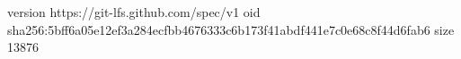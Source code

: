 version https://git-lfs.github.com/spec/v1
oid sha256:5bff6a05e12ef3a284ecfbb4676333c6b173f41abdf441e7c0e68c8f44d6fab6
size 13876
